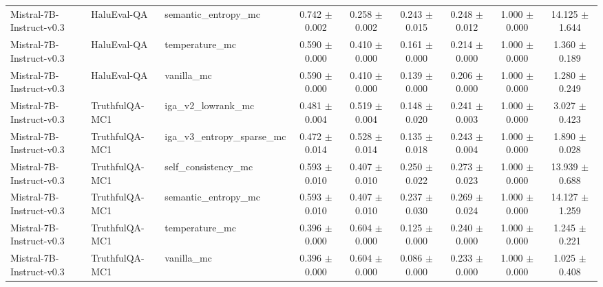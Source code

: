 \begin{table}[t]
\begin{tabular}{lllcccccc}
Mistral-7B-Instruct-v0.3 & HaluEval-QA & semantic\_entropy\_mc & 0.742 $\pm$ 0.002 & 0.258 $\pm$ 0.002 & 0.243 $\pm$ 0.015 & 0.248 $\pm$ 0.012 & 1.000 $\pm$ 0.000 & 14.125 $\pm$ 1.644 \\
Mistral-7B-Instruct-v0.3 & HaluEval-QA & temperature\_mc & 0.590 $\pm$ 0.000 & 0.410 $\pm$ 0.000 & 0.161 $\pm$ 0.000 & 0.214 $\pm$ 0.000 & 1.000 $\pm$ 0.000 & 1.360 $\pm$ 0.189 \\
Mistral-7B-Instruct-v0.3 & HaluEval-QA & vanilla\_mc & 0.590 $\pm$ 0.000 & 0.410 $\pm$ 0.000 & 0.139 $\pm$ 0.000 & 0.206 $\pm$ 0.000 & 1.000 $\pm$ 0.000 & 1.280 $\pm$ 0.249 \\
Mistral-7B-Instruct-v0.3 & TruthfulQA-MC1 & iga\_v2\_lowrank\_mc & 0.481 $\pm$ 0.004 & 0.519 $\pm$ 0.004 & 0.148 $\pm$ 0.020 & 0.241 $\pm$ 0.003 & 1.000 $\pm$ 0.000 & 3.027 $\pm$ 0.423 \\
Mistral-7B-Instruct-v0.3 & TruthfulQA-MC1 & iga\_v3\_entropy\_sparse\_mc & 0.472 $\pm$ 0.014 & 0.528 $\pm$ 0.014 & 0.135 $\pm$ 0.018 & 0.243 $\pm$ 0.004 & 1.000 $\pm$ 0.000 & 1.890 $\pm$ 0.028 \\
Mistral-7B-Instruct-v0.3 & TruthfulQA-MC1 & self\_consistency\_mc & 0.593 $\pm$ 0.010 & 0.407 $\pm$ 0.010 & 0.250 $\pm$ 0.022 & 0.273 $\pm$ 0.023 & 1.000 $\pm$ 0.000 & 13.939 $\pm$ 0.688 \\
Mistral-7B-Instruct-v0.3 & TruthfulQA-MC1 & semantic\_entropy\_mc & 0.593 $\pm$ 0.010 & 0.407 $\pm$ 0.010 & 0.237 $\pm$ 0.030 & 0.269 $\pm$ 0.024 & 1.000 $\pm$ 0.000 & 14.127 $\pm$ 1.259 \\
Mistral-7B-Instruct-v0.3 & TruthfulQA-MC1 & temperature\_mc & 0.396 $\pm$ 0.000 & 0.604 $\pm$ 0.000 & 0.125 $\pm$ 0.000 & 0.240 $\pm$ 0.000 & 1.000 $\pm$ 0.000 & 1.245 $\pm$ 0.221 \\
Mistral-7B-Instruct-v0.3 & TruthfulQA-MC1 & vanilla\_mc & 0.396 $\pm$ 0.000 & 0.604 $\pm$ 0.000 & 0.086 $\pm$ 0.000 & 0.233 $\pm$ 0.000 & 1.000 $\pm$ 0.000 & 1.025 $\pm$ 0.408 \\
\bottomrule
\end{tabular}
\end{table}

